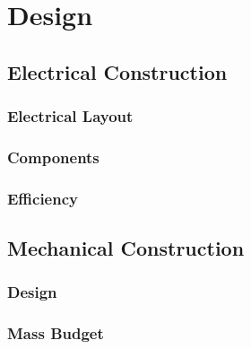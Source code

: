 \section{Design}

\subsection{Electrical Construction}
\subsubsection{Electrical Layout}
\subsubsection{Components}
\subsubsection{Efficiency}

\subsection{Mechanical Construction}
\subsubsection{Design}
\subsubsection{Mass Budget}